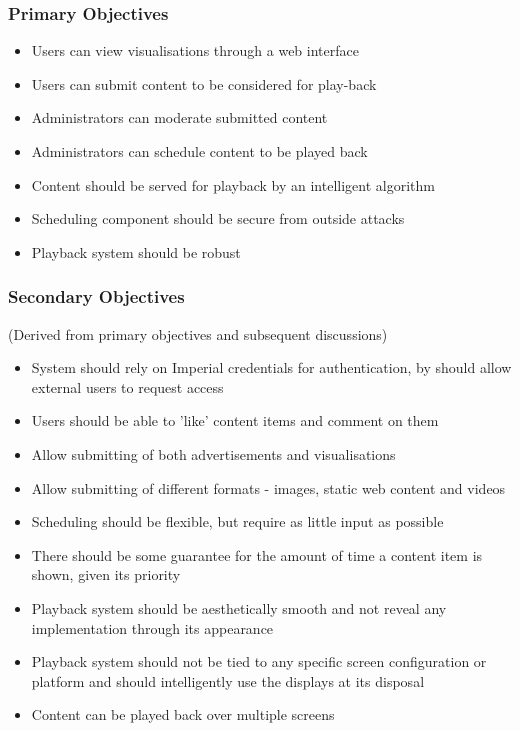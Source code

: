 \documentclass[a4paper, titlepage]{article}
\begin{document}
\subsubsection{Primary Objectives} \label{sec:primary_objectives}
\begin{itemize}
\itemsep-1mm
\item Users can view visualisations through a web interface
\item Users can submit content to be considered for play-back
\item Administrators can moderate submitted content
\item Administrators can schedule content to be played back
\item Content should be served for playback by an intelligent algorithm
\item Scheduling component should be secure from outside attacks
\item Playback system should be robust
\end{itemize}

\subsubsection{Secondary Objectives} \label{sec:secondary_objectives}
(Derived from primary objectives and subsequent discussions)

\begin{itemize}
\itemsep-1mm
\item System should rely on Imperial credentials for authentication, by should allow external users to request access
\item Users should be able to 'like' content items and comment on them
\item Allow submitting of both advertisements and visualisations
\item Allow submitting of different formats - images, static web content and videos
\item Scheduling should be flexible, but require as little input as possible
\item There should be some guarantee for the amount of time a content item is shown, given its priority
\item Playback system should be aesthetically smooth and not reveal any implementation through its appearance
\item Playback system should not be tied to any specific screen configuration or platform and should intelligently use the displays at its disposal
\item Content can be played back over multiple screens
\end{itemize}
\end{document}
